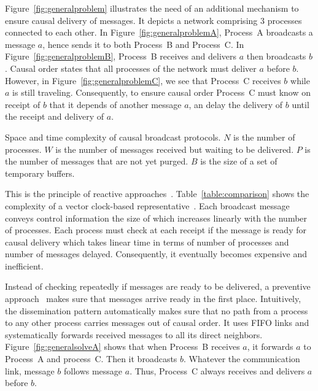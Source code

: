 Figure~\ref{fig:generalproblem} illustrates the need of an additional mechanism
to ensure causal delivery of messages. It depicts a network comprising 3
processes connected to each other. In Figure~\ref{fig:generalproblemA},
Process~A broadcasts a message $a$, hence sends it to both Process~B and
Process~C.  In Figure~\ref{fig:generalproblemB}, Process~B receives and delivers
$a$ then broadcasts $b$. Causal order states that all processes of the network
must deliver $a$ before $b$. However, in Figure~\ref{fig:generalproblemC}, we
see that Process~C receives $b$ while $a$ is still traveling. Consequently, to
ensure causal order Process~C must know on receipt of $b$ that it depends of
another message $a$, an delay the delivery of $b$ until the receipt and delivery
of $a$.

\begin{table}
  \caption{\label{table:comparison} Space and time complexity of causal
    broadcast protocols. 
    $N$ is the number of processes. 
    $W$ is the number of messages received but waiting to be delivered.
    $P$ is the number of messages that are not yet purged.
    $B$ is the size of a set of temporary buffers.}
  
\end{table}

This is the principle of reactive
approaches~\cite{almeida2008interval,fidge1988timestamps,hadzilacos1993fault,mattern1989virtual,mostefaoui2017probabilistic,singhal1992efficient}.
Table~\ref{table:comparison} shows the complexity of a vector clock-based
representative~\cite{schwarz1994detecting}.  Each broadcast message conveys
control information the size of which increases linearly with the number of
processes. Each process must check at each receipt if the message is ready for
causal delivery which takes linear time in terms of number of processes and
number of messages delayed. Consequently, 
it eventually becomes expensive and inefficient.

Instead of checking repeatedly if messages are ready to be delivered, a
preventive approach~\cite{friedman2004} makes sure that messages arrive ready
in the first place. Intuitively, the dissemination pattern automatically makes
sure that no path from a process to any other process carries messages out of
causal order. It uses FIFO links and systematically forwards received messages
to all its direct neighbors. Figure~\ref{fig:generalsolveA} shows that when
Process~B receives $a$, it forwards $a$ to Process~A and process~C. Then it
broadcasts $b$. Whatever the communication link, message $b$ follows message
$a$. Thus, Process~C always receives and delivers $a$ before
$b$. 

